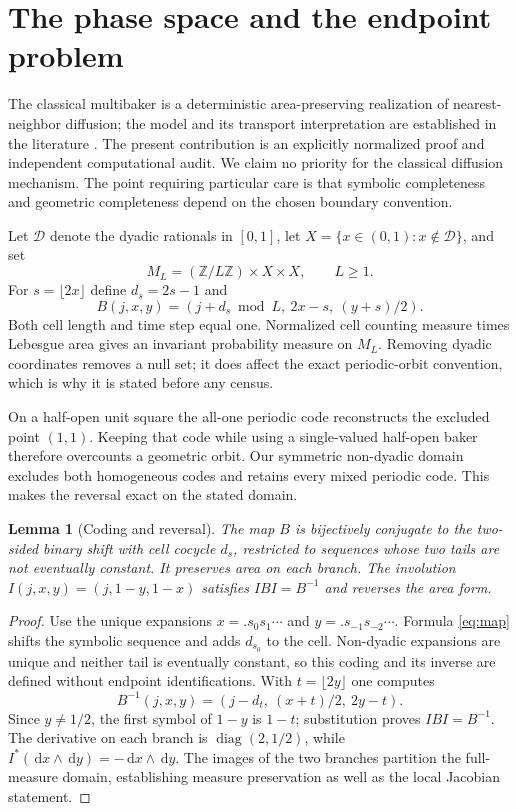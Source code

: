 \documentclass[10pt]{article}
\newtheorem{lemma}{Lemma}
\newcommand{\ZZ}{\mathbb Z}
\newcommand{\dd}{\,\mathrm d}
\begin{document}
\section{The phase space and the endpoint problem}
The classical multibaker is a deterministic area-preserving realization of
nearest-neighbor diffusion; the model and its transport interpretation are
established in the literature \cite{gaspard,wojcik}. The present contribution
is an explicitly normalized proof and independent computational audit. We
claim no priority for the classical diffusion mechanism. The point requiring
particular care is that symbolic completeness and geometric completeness
depend on the chosen boundary convention.

Let $\mathcal D$ denote the dyadic rationals in $[0,1]$, let
$X=\{x\in(0,1):x\notin\mathcal D\}$, and set
\[
M_L=(\ZZ/L\ZZ)\times X\times X,\qquad L\geq1.
\]
For $s=\lfloor2x\rfloor$ define $d_s=2s-1$ and
\begin{equation}\label{eq:map}
B(j,x,y)=(j+d_s\bmod L,\ 2x-s,\ (y+s)/2).
\end{equation}
Both cell length and time step equal one. Normalized cell counting measure
times Lebesgue area gives an invariant probability measure on $M_L$.
Removing dyadic coordinates removes a null set; it does affect the exact
periodic-orbit convention, which is why it is stated before any census.

On a half-open unit square the all-one periodic code reconstructs the
excluded point $(1,1)$. Keeping that code while using a single-valued
half-open baker therefore overcounts a geometric orbit. Our symmetric
non-dyadic domain excludes both homogeneous codes and retains every mixed
periodic code. This makes the reversal exact on the stated domain.

\begin{lemma}[Coding and reversal]\label{lem:code}
The map $B$ is bijectively conjugate to the two-sided binary shift with cell
cocycle $d_s$, restricted to sequences whose two tails are not eventually
constant. It preserves area on each branch. The involution
$I(j,x,y)=(j,1-y,1-x)$ satisfies $IBI=B^{-1}$ and reverses the area form.
\end{lemma}
\begin{proof}
Use the unique expansions $x=.s_0s_1\cdots$ and
$y=.s_{-1}s_{-2}\cdots$. Formula \eqref{eq:map} shifts the symbolic sequence
and adds $d_{s_0}$ to the cell. Non-dyadic expansions are unique and neither
tail is eventually constant, so this coding and its inverse are defined
without endpoint identifications. With $t=\lfloor2y\rfloor$ one computes
\[
B^{-1}(j,x,y)=(j-d_t,\ (x+t)/2,\ 2y-t).
\]
Since $y\neq1/2$, the first symbol of $1-y$ is $1-t$; substitution proves
$IBI=B^{-1}$. The derivative on each branch is
$\operatorname{diag}(2,1/2)$, while $I^*(\dd x\wedge\dd y)=-\dd x\wedge\dd y$.
The images of the two branches partition the full-measure domain, establishing
measure preservation as well as the local Jacobian statement.
\end{proof}
\end{document}
